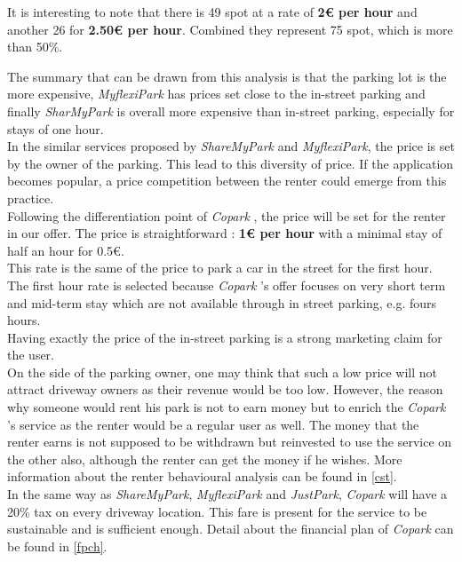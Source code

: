 \documentclass[12pt,a4paper,oneside]{book}
\newcommand{\bp}{\textit{Copark }}
\begin{document}
\begin{itemize}
It is interesting to note that there is 49 spot at a rate of \textbf{2\euro{} per hour} and another 26 for \textbf{2.50\euro{} per hour}. Combined they represent 75 spot, which is more than 50\%.
\end{itemize}

The summary that can be drawn from this analysis is that the parking lot is the more expensive, \textit{MyflexiPark} has prices set close to the in-street parking and finally \textit{SharMyPark} is overall more expensive than in-street parking, especially for stays of one hour.\\

In the similar services proposed by \textit{ShareMyPark} and \textit{MyflexiPark}, the price is set by the owner of the parking. This lead to this diversity of price. If the application becomes popular, a price competition between the renter could emerge from this practice.\\

Following the differentiation point of \bp, the price will be set for the renter in our offer. The price is straightforward : \textbf{1\euro{} per hour} with a minimal stay of half an hour for 0.5\euro{}.\\
This rate is the same of the price to park a car in the street for the first hour. The first hour rate is selected because \bp's offer focuses on very short term and mid-term stay which are not available through in street parking, e.g. fours hours.\\
Having exactly the price of the in-street parking is a strong marketing claim for the user.\\

On the side of the parking owner, one may think that such a low price will not attract driveway owners as their revenue would be too low. However, the reason why someone would rent his park is not to earn money but to enrich the \bp's service as the renter would be a regular user as well. The money that the renter earns is not supposed to be withdrawn but reinvested to use the service on the other also, although the renter can get the money if he wishes. More information about the renter behavioural analysis can be found in \autoref{cst}.\\

In the same way as \textit{ShareMyPark}, \textit{MyflexiPark} and \textit{JustPark}, \bp will have a 20\% tax on every driveway location. This fare is present for the service to be sustainable and is sufficient enough. Detail about the financial plan of \bp can be found in \autoref{fpch}.\\
\end{document}
